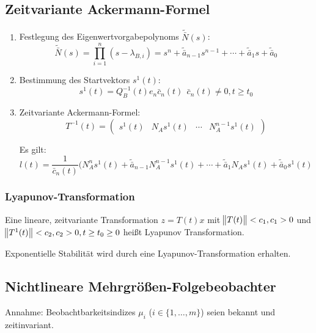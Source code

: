 \subsection{Zeitvariante Ackermann-Formel}
\begin{enumerate}
    \item
        Festlegung des Eigenwertvorgabepolynoms $\tilde{\bar{N}}(s)$:
        \begin{equation}
            \tilde{\bar{N}}(s) = \prod_{i=1}^n (s-\lambda_{B,i})
                = s^n + \tilde{\bar{a}}_{n-1} s^{n-1} + \cdots + \tilde{\bar{a}}_1 s +
                    \tilde{\bar{a}}_0
        \end{equation}
    \item
        Bestimmung des Startvektors $s^1(t)$:
        \begin{equation}
            s^1(t) = Q_B^{-1} (t) e_n \bar{c}_n (t)\ \ \bar{c}_n(t) \neq 0, t \geq t_0
        \end{equation}
    \item Zeitvariante Ackermann-Formel:
        \begin{equation}
            T^{-1}(t) = \begin{pmatrix}
                s^1(t) & N_A s^1(t) & \cdots & N_A^{n-1} s^1(t)
            \end{pmatrix}
        \end{equation}
        
        Es gilt:
        \begin{equation}
            l(t) = \frac{1}{\bar{c}_n(t)} (N_A^n s^1(t) + 
                \tilde{\bar{a}}_{n-1} N_A^{n-1} s^1(t) + \cdots +
                \tilde{\bar{a}}_1 N_A s^1(t) + \tilde{\bar{a}}_0 s^1(t)
        \end{equation}
\end{enumerate}


\subsubsection{Lyapunov-Transformation}
Eine lineare, zeitvariante Transformation $z=T(t) x$ mit $\norm{T(t)} < c_1, c_1 > 0$ und
$\norm{T^1(t)} < c_2, c_2 > 0, t \geq t_0 \geq 0$ heißt Lyapunov Transformation.

Exponentielle Stabilität wird durch eine Lyapunov-Transformation erhalten.

\subsection{Nichtlineare Mehrgrößen-Folgebeobachter}
Annahme: Beobachtbarkeitsindizes $\mu_i$ ($i \in \{1, \ldots, m\}$) seien bekannt
und zeitinvariant.

